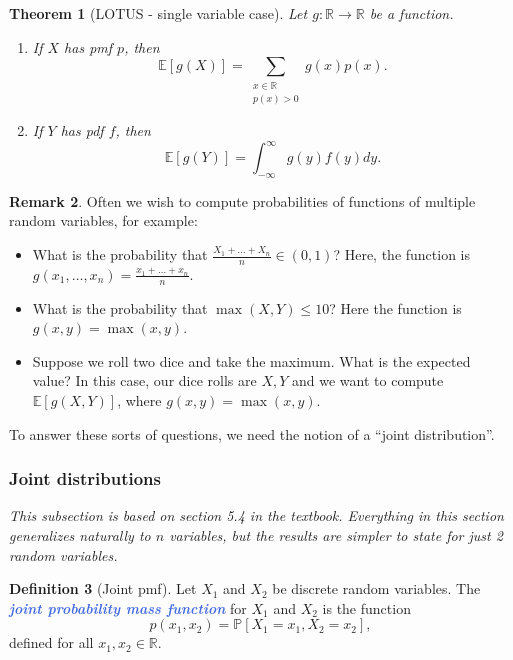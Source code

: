 \documentclass[10pt]{article}
\newtheorem{theorem}{Theorem}
\theoremstyle{definition}
\newtheorem{definition}[theorem]{Definition}
\newtheorem{remark}[theorem]{Remark}
\newcommand{\1}[1]{\textbf{1}_{\left[#1\right]}} %
\def\R{\mathbb{R}} %
\def\E{\mathbb{E}} %
\def\P{\mathbb{P}} %
\newcommand{\demph}[1]{\textcolor{RoyalBlue}{\textbf{\slshape #1}}} %
\begin{document}
\begin{theorem}[LOTUS - single variable case]
  \label{thm:law-unconscious-statistician}
  Let $g:\R \to \R$ be a function.
  \begin{enumerate}[label=\rm{(\roman*.)}]
    \item If $X$ has pmf $p$, then
    \begin{equation*}
      \E\left[g(X) \right]= \sum_{\substack{x\in \R\\ p(x)>0}} g(x)p(x).
    \end{equation*}
    \item If $Y$ has pdf $f$, then
    \begin{equation*}
      \E\left[g(Y) \right] = \int_{-\infty}^{\infty}g(y)f(y)dy.
    \end{equation*}

  \end{enumerate}
\end{theorem}

\begin{remark}
  \label{rmk:need-for-joint-distn}
  Often we wish to compute probabilities of functions of multiple random
  variables, for example:
  \begin{itemize}
    \item What is the probability that
    $\frac{X_{1}+\ldots+X_{n}}{n}\in (0,1)$? Here, the function is
    $g(x_{1},\ldots,x_{n})= \frac{x_{1}+\ldots+x_{n}}{n}$.
    \item What is the probability that $\max(X,Y) \leq 10$? Here the function is
    $g(x,y)=\max(x,y).$
    \item Suppose we roll two dice and take the maximum. What is the expected
    value? In this case, our dice rolls are $X,Y$ and we want to compute
    $\E\left[g(X,Y) \right]$, where $g(x,y) = \max(x,y)$.
  \end{itemize}
  To answer these sorts of questions, we need the notion of a ``joint distribution''.
\end{remark}

\subsubsection{Joint distributions}
\textit{This subsection is based on section 5.4 in the textbook. Everything in
  this section generalizes naturally to $n$ variables, but the results are
  simpler to state for just 2 random variables.}



\begin{definition}[Joint pmf]
  \label{def:joint-pmf}
  Let $X_{1}$ and $X_{2}$ be discrete random variables. The \demph{joint
    probability mass function} for $X_{1}$ and $X_{2}$ is the function
  \begin{equation*}
    p(x_{1},x_{2}) = \P\left[X_{1}=x_{1},X_{2}=x_{2} \right],
  \end{equation*}
  defined for all $x_{1},x_{2}\in \R$.
\end{definition}
\end{document}
